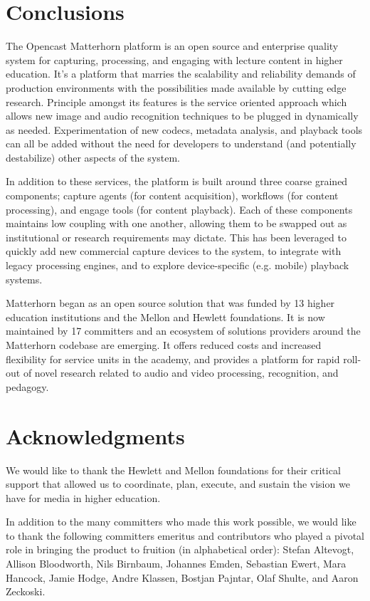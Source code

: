 \documentclass{sig-alternate}
\begin{document}
\section{Conclusions}
The Opencast Matterhorn platform is an open source and enterprise quality system for capturing, processing, and engaging with lecture content in higher education.  It's a platform that marries the scalability and reliability demands of production environments with the possibilities made available by cutting edge research.  Principle amongst its features is the service oriented approach which allows new image and audio recognition techniques to be plugged in dynamically as needed.  Experimentation of new codecs, metadata analysis, and playback tools can all be added without the need for developers to understand (and potentially destabilize) other aspects of the system.

In addition to these services, the platform is built around three coarse grained components; capture agents (for content acquisition), workflows (for content processing), and engage tools (for content playback).  Each of these components maintains low coupling with one another, allowing them to be swapped out as institutional or research requirements may dictate.  This has been leveraged to quickly add new commercial capture devices to the system, to integrate with legacy processing engines, and to explore device-specific (e.g. mobile) playback systems.

Matterhorn began as an open source solution that was funded by 13 higher education institutions and the Mellon and Hewlett foundations.  It is now maintained by 17 committers and an ecosystem of solutions providers around the Matterhorn codebase are emerging.  It offers reduced costs and increased flexibility for service units in the academy, and provides a platform for rapid roll-out of novel research related to audio and video processing, recognition, and pedagogy.

\section{Acknowledgments}
We would like to thank the Hewlett and Mellon foundations for their critical support that allowed us to coordinate, plan, execute, and sustain the vision we have for media in higher education.

In addition to the many committers who made this work possible, we would like to thank the following committers emeritus and contributors who played a pivotal role in bringing the product to fruition (in alphabetical order): Stefan Altevogt, Allison Bloodworth, Nils Birnbaum, Johannes Emden, Sebastian Ewert, Mara Hancock, Jamie Hodge, Andre Klassen, Bostjan Pajntar, Olaf Shulte, and Aaron Zeckoski.
\end{document}

